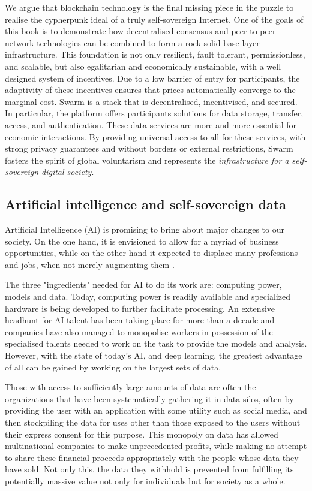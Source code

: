 We argue that blockchain technology is the final missing piece in the puzzle to realise the cypherpunk ideal of a truly self-sovereign Internet. One of the goals of this book is to demonstrate how decentralised consensus and peer-to-peer network technologies can be combined to form a rock-solid base-layer infrastructure. This foundation is not only resilient, fault tolerant, permissionless, and scalable, but also egalitarian and economically sustainable, with a well designed system of incentives. Due to a low barrier of entry for participants, the adaptivity of these incentives ensures that prices automatically converge to the marginal cost.
Swarm is a  stack that is decentralised, incentivised, and secured. In particular, the platform offers participants solutions for data storage, transfer, access, and authentication. These data services are more and more essential for economic interactions. By providing universal access to all for these services, with strong privacy guarantees and without borders or external restrictions, Swarm fosters the spirit of global voluntarism and represents the \emph{infrastructure for a self-sovereign digital society}.

\subsection{Artificial intelligence and self-sovereign data \statusgreen} \label{sec:AIdata}

Artificial Intelligence (AI) is promising to bring about major changes to our society. On the one hand, it is envisioned to allow for a myriad of business opportunities, while on the other hand it expected to displace many professions and jobs, when not merely augmenting them \cite{Lee2018Sep}.

The three "ingredients" needed for AI to do its work are: computing power, models and data. Today, computing power is readily available and specialized hardware is being developed to further facilitate processing. An extensive headhunt for AI talent has been taking place for more than a decade and companies have also managed to monopolise workers in possession of the specialised talents needed to work on the task to provide the models and analysis. However, with the state of today's AI, and deep learning, the greatest advantage of all can be gained by working on the largest sets of data.

Those with access to sufficiently large amounts of data are often the organizations that have been systematically gathering it in data silos, often by providing the user with an application with some utility such as social media, and then stockpiling the data for uses other than those exposed to the users without their express consent for this purpose. This monopoly on data has allowed multinational companies to make unprecedented profits, while making no attempt to share these financial proceeds appropriately with the people whose data they have sold. Not only this, the data they withhold is prevented from fulfilling its potentially massive value not only for individuals but for society as a whole.

